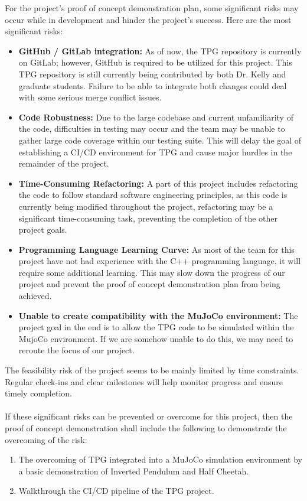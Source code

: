 \documentclass{article}
\begin{document}
For the project's proof of concept demonstration plan, some significant risks may occur while in development and hinder the project's success. Here are the most significant risks:
\begin{itemize}
  \item \textbf{GitHub / GitLab integration:} As of now, the TPG repository is currently on GitLab; however, GitHub is required to be utilized for this project. This TPG repository is still currently being contributed by both Dr. Kelly and graduate students. Failure to be able to integrate both changes could deal with some serious merge conflict issues.
  \item \textbf{Code Robustness:} Due to the large codebase and current unfamiliarity of the code, difficulties in testing may occur and the team may be unable to gather large code coverage within our testing suite. This will delay the goal of establishing a CI/CD environment for TPG and cause major hurdles in the remainder of the project.
  \item \textbf{Time-Consuming Refactoring:} A part of this project includes refactoring the code to follow standard software engineering principles, as this code is currently being modified throughout the project, refactoring may be a significant time-consuming task, preventing the completion of the other project goals.
  \item \textbf{Programming Language Learning Curve:} As most of the team for this project have not had experience with the C++ programming language, it will require some additional learning. This may slow down the progress of our project and prevent the proof of concept demonstration plan from being achieved.
  \item \textbf{Unable to create compatibility with the MuJoCo environment:} The project goal in the end is to allow the TPG code to be simulated within the MujoCo environment. If we are somehow unable to do this, we may need to reroute the focus of our project.
\end{itemize}


\noindent The feasibility risk of the project seems to be mainly limited by time constraints. Regular check-ins and clear milestones will help monitor progress and ensure timely completion.
\\\\
If these significant risks can be prevented or overcome for this project, then the proof of concept demonstration shall include the following to demonstrate the overcoming of the risk: 
\begin{enumerate}
 \item The overcoming of TPG integrated into a MuJoCo simulation environment by a basic demonstration of Inverted Pendulum and Half Cheetah. 
 \item Walkthrough the CI/CD pipeline of the TPG project. 
\end{enumerate}
\end{document}
